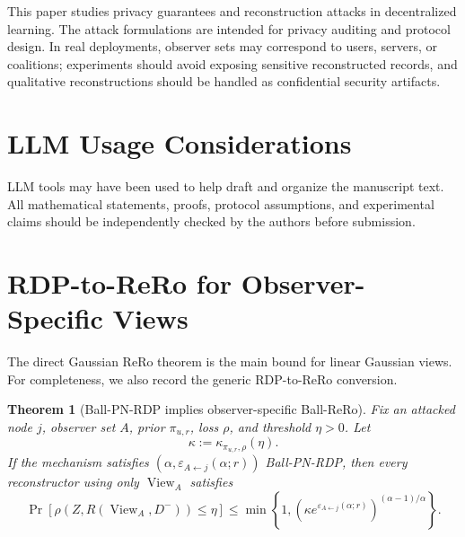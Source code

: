 \documentclass[conference,compsoc]{IEEEtran}
\newtheorem{theorem}{Theorem}
\newcommand{\eps}{\varepsilon}
\begin{document}
This paper studies privacy guarantees and reconstruction attacks in decentralized learning. The attack formulations are intended for privacy auditing and protocol design. In real deployments, observer sets may correspond to users, servers, or coalitions; experiments should avoid exposing sensitive reconstructed records, and qualitative reconstructions should be handled as confidential security artifacts.

\section{LLM Usage Considerations}

LLM tools may have been used to help draft and organize the manuscript text. All mathematical statements, proofs, protocol assumptions, and experimental claims should be independently checked by the authors before submission.

\appendices

\section{RDP-to-ReRo for Observer-Specific Views}
\label{app:rdp-rero}

The direct Gaussian ReRo theorem is the main bound for linear Gaussian views. For completeness, we also record the generic RDP-to-ReRo conversion.

\begin{theorem}[Ball-PN-RDP implies observer-specific Ball-ReRo]
\label{thm:pn-rdp-rero}
Fix an attacked node $j$, observer set $A$, prior $\pi_{u,r}$, loss $\rho$, and threshold $\eta>0$. Let
\[
\kappa:=\kappa_{\pi_{u,r},\rho}(\eta).
\]
If the mechanism satisfies $(\alpha,\eps_{A\leftarrow j}(\alpha;r))$ Ball-PN-RDP, then every reconstructor using only $\operatorname{View}_A$ satisfies
\[
\Pr[\rho(Z,R(\operatorname{View}_A,D^-))\le\eta]
\le
\min\left\{1,\left(\kappa e^{\eps_{A\leftarrow j}(\alpha;r)}\right)^{(\alpha-1)/\alpha}\right\}.
\]
\end{theorem}
\end{document}
